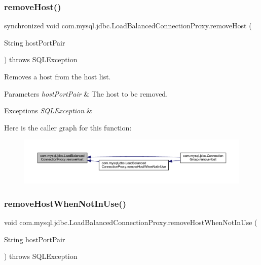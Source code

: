 \subsubsection{\texorpdfstring{remove\+Host()}{removeHost()}}
{\footnotesize\ttfamily synchronized void com.\+mysql.\+jdbc.\+Load\+Balanced\+Connection\+Proxy.\+remove\+Host (\begin{DoxyParamCaption}\item[{String}]{host\+Port\+Pair }\end{DoxyParamCaption}) throws S\+Q\+L\+Exception}

Removes a host from the host list.


\begin{DoxyParams}{Parameters}
{\em host\+Port\+Pair} & The host to be removed. \\
\hline
\end{DoxyParams}

\begin{DoxyExceptions}{Exceptions}
{\em S\+Q\+L\+Exception} & \\
\hline
\end{DoxyExceptions}
Here is the caller graph for this function\+:
\nopagebreak
\begin{figure}[H]
\begin{center}
\leavevmode
\includegraphics[width=350pt]{classcom_1_1mysql_1_1jdbc_1_1_load_balanced_connection_proxy_a671d1d7d042aa5164bf1078996303433_icgraph}
\end{center}
\end{figure}
\mbox{\label{classcom_1_1mysql_1_1jdbc_1_1_load_balanced_connection_proxy_af3322f74308fe5ca51f73f36f99aa12f}} 
\subsubsection{\texorpdfstring{remove\+Host\+When\+Not\+In\+Use()}{removeHostWhenNotInUse()}}
{\footnotesize\ttfamily void com.\+mysql.\+jdbc.\+Load\+Balanced\+Connection\+Proxy.\+remove\+Host\+When\+Not\+In\+Use (\begin{DoxyParamCaption}\item[{String}]{host\+Port\+Pair }\end{DoxyParamCaption}) throws S\+Q\+L\+Exception}

